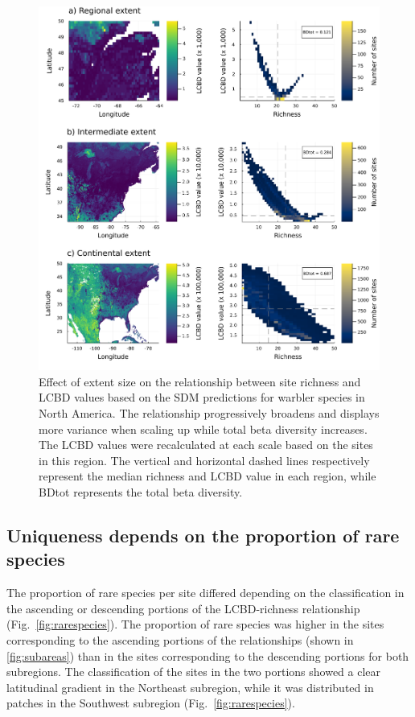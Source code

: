 \documentclass[10pt,oneside]{article}
\makeatletter
\def\maxwidth{\ifdim\Gin@nat@width>\linewidth\linewidth
\else\Gin@nat@width\fi}
\let\Oldincludegraphics\includegraphics
\renewcommand{\includegraphics}[1]{\Oldincludegraphics[width=\maxwidth]{#1}}
\makeatother
\begin{document}
\begin{figure}
\hypertarget{fig:extents}{%
\centering
\includegraphics{figures/subareas-extents.png}
\caption{Effect of extent size on the relationship between site richness
and LCBD values based on the SDM predictions for warbler species in
North America. The relationship progressively broadens and displays more
variance when scaling up while total beta diversity increases. The LCBD
values were recalculated at each scale based on the sites in this
region. The vertical and horizontal dashed lines respectively represent
the median richness and LCBD value in each region, while BDtot
represents the total beta diversity.}\label{fig:extents}
}
\end{figure}

\hypertarget{uniqueness-depends-on-the-proportion-of-rare-species}{%
\subsection{Uniqueness depends on the proportion of rare
species}\label{uniqueness-depends-on-the-proportion-of-rare-species}}

The proportion of rare species per site differed depending on the
classification in the ascending or descending portions of the
LCBD-richness relationship (Fig.~\ref{fig:rarespecies}). The proportion
of rare species was higher in the sites corresponding to the ascending
portions of the relationships (shown in \ref{fig:subareas}) than in the
sites corresponding to the descending portions for both subregions. The
classification of the sites in the two portions showed a clear
latitudinal gradient in the Northeast subregion, while it was
distributed in patches in the Southwest subregion
(Fig.~\ref{fig:rarespecies}).
\end{document}
